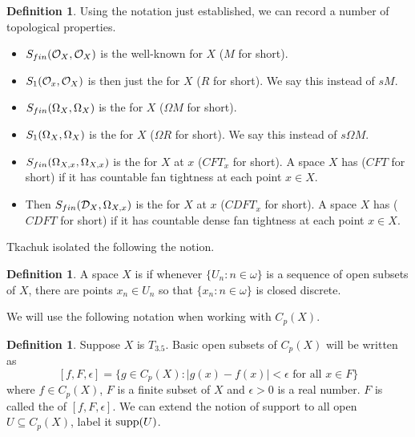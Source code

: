 \documentclass{amsart}
\theoremstyle{plain}
\theoremstyle{definition}
\newtheorem{definition}[theorem]{Definition}
\theoremstyle{remark}
\theoremstyle{plain}
\theoremstyle{definition}
\theoremstyle{remark}
\begin{document}
\begin{definition}
 Using the notation just established, we can record a number of topological properties.
  \begin{itemize}
   \item \(S_{fin}(\mathcal{O}_X,\mathcal{O}_X)\) is the well-known  for \(X\) (\(M\) for short).
   \item \(S_{1}(\mathcal{O}_x,\mathcal{O}_X)\) is then just the  for \(X\) (\(R\) for short). We say this instead of \(sM\).
   \item \(S_{fin}(\Omega_X,\Omega_X)\) is the  for \(X\) (\(\Omega M\) for short).
   \item \(S_{1}(\Omega_X,\Omega_X)\) is the  for \(X\) (\(\Omega R\) for short). We say this instead of \(s\Omega M\).
   \item \(S_{fin}(\Omega_{X,x},\Omega_{X,x})\) is the  for \(X\) at \(x\) (\(CFT_x\) for short). A space \(X\) has  (\(CFT\) for short)
    if it has countable fan tightness at each point \(x\in X\).
   \item  Then \(S_{fin}(\mathcal{D}_X,\Omega_{X,x})\) is the  for \(X\) at \(x\) (\(CDFT_x\) for short). A space \(X\) has  (\(CDFT\) for short) if it has countable dense fan tightness at each point \(x\in X\).
  \end{itemize}
\end{definition}

Tkachuk isolated the following the notion.

\begin{definition}
 A space \(X\) is  if whenever \(\{U_n : n \in \omega\}\) is a sequence of open subsets of \(X\), there are points \(x_n \in U_n\) so that \(\{x_n : n \in \omega\}\) is closed discrete.
\end{definition}

We will use the following notation when working with \(C_p(X)\).

\begin{definition}
 Suppose \(X\) is \(T_{3.5}\).
 Basic open subsets of \(C_p(X)\) will be written as
 \[
  [f,F,\epsilon] = \{g\in C_p(X):|g(x)-f(x)|<\epsilon\text{ for all }x\in F\}
 \]
 where \(f \in C_p(X)\), \(F\) is a finite subset of \(X\) and \(\epsilon > 0\) is a real number.
 \(F\) is called the  of \([f,F,\epsilon]\).
 We can extend the notion of support to all open \(U \subseteq C_p(X)\), label it \(\textrm{supp}(U)\).
\end{definition}
\end{document}
